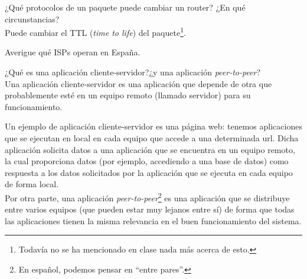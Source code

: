 \begin{ejercicio}
    ¿Qué protocolos de un paquete puede cambiar un router? ¿En qué circunstancias?\\

    Puede cambiar el TTL (\textit{time to life}) del paquete\footnote{Todavía no se ha mencionado en clase nada más acerca de esto.}.
\end{ejercicio}

\begin{ejercicio} %
    Averigue qué ISPs operan en España.
\end{ejercicio}

\begin{ejercicio}
    ¿Qué es una aplicación cliente-servidor?¿y una aplicación \textit{peer-to-peer}?\\

    Una aplicación cliente-servidor es una aplicación que depende de otra que probablemente esté en un equipo remoto (llamado servidor) para su funcionamiento. 

    Un ejemplo de aplicación cliente-servidor es una página web: tenemos aplicaciones que se ejecutan en local en cada equipo que accede a una determinada url. Dicha aplicación solicita datos a una aplicación que se encuentra en un equipo remoto, la cual proporciona datos (por ejemplo, accediendo a una base de datos) como respuesta a los datos solicitados por la aplicación que se ejecuta en cada equipo de forma local.\\

    Por otra parte, una aplicación \textit{peer-to-peer}\footnote{En español, podemos pensar en ``entre pares''.} es una aplicación que se distribuye entre varios equipos (que pueden estar muy lejanos entre sí) de forma que todas las aplicaciones tienen la misma relevancia en el buen funcionamiento del sistema.
\end{ejercicio}

